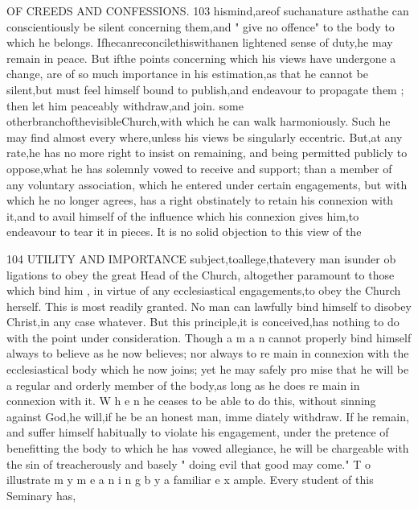 \documentclass[
]{book}
\begin{document}
OF CREEDS AND CONFESSIONS. 103
hismind,areof suchanature asthathe can conscientiously be silent concerning them,and
" give no offence" to the body to which he belongs. Ifhecanreconcilethiswithanen
lightened sense of duty,he may remain in peace. But ifthe points concerning which his views have undergone a change, are of so much importance in his estimation,as that he cannot be silent,but must feel himself bound to publish,and endeavour to propagate them ; then let him peaceably withdraw,and join. some otherbranchofthevisibleChurch,with which he can walk harmoniously. Such he may find almost every where,unless his views
be singularly eccentric. But,at any rate,he has no more right to insist on remaining, and being permitted publicly to oppose,what he has solemnly vowed to receive and support; than a member of any voluntary association, which he entered under certain engagements, but with which he no longer agrees, has a
right obstinately to retain his connexion with
it,and to avail himself of the influence which
his connexion gives him,to endeavour to tear it in pieces.
It is no solid objection to this view of the

104 UTILITY AND IMPORTANCE
subject,toallege,thatevery man isunder ob ligations to obey the great Head of the Church, altogether paramount to those which bind him , in virtue of any ecclesiastical engagements,to
obey the Church herself. This is most readily granted. No man can lawfully bind himself
to disobey Christ,in any case whatever. But
this principle,it is conceived,has nothing to do with the point under consideration. Though a m a n cannot properly bind himself always to believe as he now believes; nor always to re main in connexion with the ecclesiastical body which he now joins; yet he may safely pro mise that he will be a regular and orderly
member of the body,as long as he does re main in connexion with it. W h e n he ceases
to be able to do this, without sinning against
God,he will,if he be an honest man, imme
diately withdraw. If he remain, and suffer himself habitually to violate his engagement,
under the pretence of benefitting the body to which he has vowed allegiance, he will be chargeable with the sin of treacherously and basely " doing evil that good may come."
T o illustrate m y m e a n i n g b y a familiar e x ample. Every student of this Seminary has,
\end{document}
